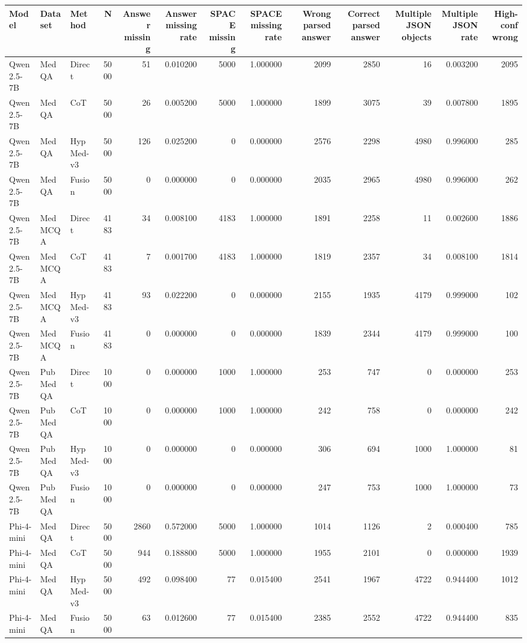 \begin{tabular}{lllrrrrrrrrrr}
\toprule
Model & Dataset & Method & N & Answer missing & Answer missing rate & SPACE missing & SPACE missing rate & Wrong parsed answer & Correct parsed answer & Multiple JSON objects & Multiple JSON rate & High-conf wrong \\
\midrule
Qwen2.5-7B & MedQA & Direct & 5000 & 51 & 0.010200 & 5000 & 1.000000 & 2099 & 2850 & 16 & 0.003200 & 2095 \\
Qwen2.5-7B & MedQA & CoT & 5000 & 26 & 0.005200 & 5000 & 1.000000 & 1899 & 3075 & 39 & 0.007800 & 1895 \\
Qwen2.5-7B & MedQA & HypMed-v3 & 5000 & 126 & 0.025200 & 0 & 0.000000 & 2576 & 2298 & 4980 & 0.996000 & 285 \\
Qwen2.5-7B & MedQA & Fusion & 5000 & 0 & 0.000000 & 0 & 0.000000 & 2035 & 2965 & 4980 & 0.996000 & 262 \\
Qwen2.5-7B & MedMCQA & Direct & 4183 & 34 & 0.008100 & 4183 & 1.000000 & 1891 & 2258 & 11 & 0.002600 & 1886 \\
Qwen2.5-7B & MedMCQA & CoT & 4183 & 7 & 0.001700 & 4183 & 1.000000 & 1819 & 2357 & 34 & 0.008100 & 1814 \\
Qwen2.5-7B & MedMCQA & HypMed-v3 & 4183 & 93 & 0.022200 & 0 & 0.000000 & 2155 & 1935 & 4179 & 0.999000 & 102 \\
Qwen2.5-7B & MedMCQA & Fusion & 4183 & 0 & 0.000000 & 0 & 0.000000 & 1839 & 2344 & 4179 & 0.999000 & 100 \\
Qwen2.5-7B & PubMedQA & Direct & 1000 & 0 & 0.000000 & 1000 & 1.000000 & 253 & 747 & 0 & 0.000000 & 253 \\
Qwen2.5-7B & PubMedQA & CoT & 1000 & 0 & 0.000000 & 1000 & 1.000000 & 242 & 758 & 0 & 0.000000 & 242 \\
Qwen2.5-7B & PubMedQA & HypMed-v3 & 1000 & 0 & 0.000000 & 0 & 0.000000 & 306 & 694 & 1000 & 1.000000 & 81 \\
Qwen2.5-7B & PubMedQA & Fusion & 1000 & 0 & 0.000000 & 0 & 0.000000 & 247 & 753 & 1000 & 1.000000 & 73 \\
Phi-4-mini & MedQA & Direct & 5000 & 2860 & 0.572000 & 5000 & 1.000000 & 1014 & 1126 & 2 & 0.000400 & 785 \\
Phi-4-mini & MedQA & CoT & 5000 & 944 & 0.188800 & 5000 & 1.000000 & 1955 & 2101 & 0 & 0.000000 & 1939 \\
Phi-4-mini & MedQA & HypMed-v3 & 5000 & 492 & 0.098400 & 77 & 0.015400 & 2541 & 1967 & 4722 & 0.944400 & 1012 \\
Phi-4-mini & MedQA & Fusion & 5000 & 63 & 0.012600 & 77 & 0.015400 & 2385 & 2552 & 4722 & 0.944400 & 835 \\

\end{tabular}
